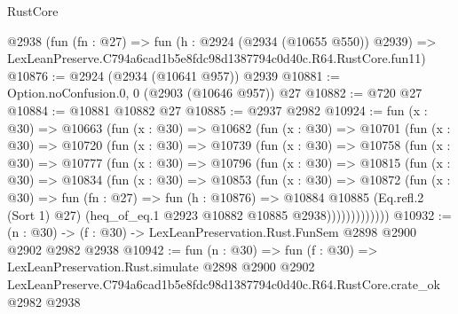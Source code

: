 \begin{lexlean}{RustCore}
\begin{coremodule}
    @2938
    (fun (fn : @27) =>
    fun (h : @2924 (@2934 (@10655 @550)) @2939) =>
    LexLeanPreserve.C794a6cad1b5e8fdc98d1387794c0d40c.R64.RustCore.fun11)
@10876 := @2924 (@2934 (@10641 @957)) @2939
@10881 := Option.noConfusion.{0, 0} (@2903 (@10646 @957)) @27
@10882 := @720 @27
@10884 := @10881 @10882 @27
@10885 := @2937 @2982
@10924 := fun (x : @30) =>
  @10663
    (fun (x : @30) =>
    @10682
      (fun (x : @30) =>
      @10701
        (fun (x : @30) =>
        @10720
          (fun (x : @30) =>
          @10739
            (fun (x : @30) =>
            @10758
              (fun (x : @30) =>
              @10777
                (fun (x : @30) =>
                @10796
                  (fun (x : @30) =>
                  @10815
                    (fun (x : @30) =>
                    @10834
                      (fun (x : @30) =>
                      @10853
                        (fun (x : @30) =>
                        @10872
                          (fun (x : @30) =>
                          fun (fn : @27) =>
                          fun (h : @10876) =>
                          @10884
                            @10885
                            (Eq.refl.{2} (Sort 1) @27)
                            (heq_of_eq.{1} @2923 @10882 @10885 @2938)))))))))))))
@10932 := (n : @30) -> (f : @30) -> LexLeanPreservation.Rust.FunSem @2898 @2900 @2902 @2982 @2938
@10942 := fun (n : @30) =>
  fun (f : @30) =>
  LexLeanPreservation.Rust.simulate
    @2898
    @2900
    @2902
    LexLeanPreserve.C794a6cad1b5e8fdc98d1387794c0d40c.R64.RustCore.crate_ok
    @2982
    @2938
\end{coremodule}
\end{lexlean}
